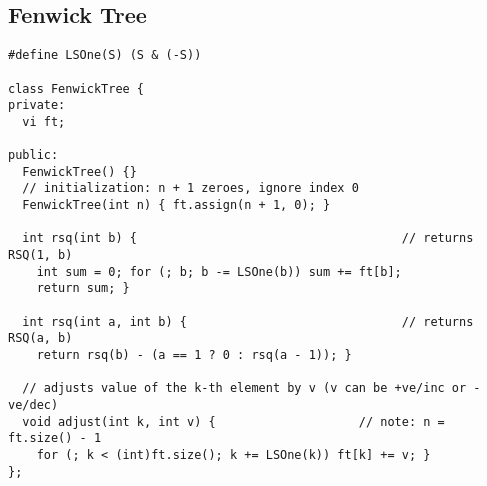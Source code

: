 \documentclass[letterpaper]{article}
\begin{document}
\subsection{Fenwick Tree}
\begin{lstlisting}
#define LSOne(S) (S & (-S))

class FenwickTree {
private:
  vi ft;

public:
  FenwickTree() {}
  // initialization: n + 1 zeroes, ignore index 0
  FenwickTree(int n) { ft.assign(n + 1, 0); }

  int rsq(int b) {                                     // returns RSQ(1, b)
    int sum = 0; for (; b; b -= LSOne(b)) sum += ft[b];
    return sum; }

  int rsq(int a, int b) {                              // returns RSQ(a, b)
    return rsq(b) - (a == 1 ? 0 : rsq(a - 1)); }

  // adjusts value of the k-th element by v (v can be +ve/inc or -ve/dec)
  void adjust(int k, int v) {                    // note: n = ft.size() - 1
    for (; k < (int)ft.size(); k += LSOne(k)) ft[k] += v; }
};
\end{lstlisting}
\end{document}
